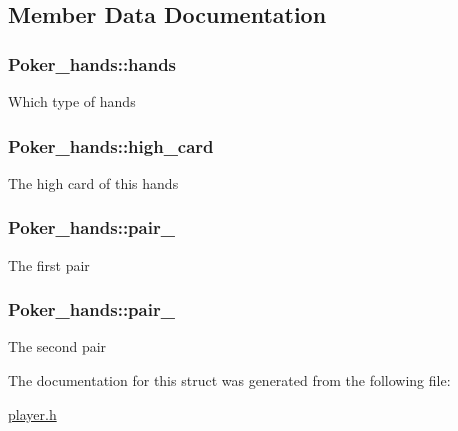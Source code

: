 \subsection{Member Data Documentation}
\hypertarget{structPoker__hands_a7b36a51226eea12e0860c901a770820f}{
\subsubsection[{hands}]{ Poker\+\_\+hands\+::hands}}\label{structPoker__hands_a7b36a51226eea12e0860c901a770820f}
Which type of hands \hypertarget{structPoker__hands_a5e69528aafb7fd7a71ad83d7a7f03456}{
\subsubsection[{high\+\_\+card}]{ Poker\+\_\+hands\+::high\+\_\+card}}\label{structPoker__hands_a5e69528aafb7fd7a71ad83d7a7f03456}
The high card of this hands \hypertarget{structPoker__hands_ad0638d6685ba9b386f479f14c47c0790}{
\subsubsection[{pair\+\_\+1}]{ Poker\+\_\+hands\+::pair\+\_}}\label{structPoker__hands_ad0638d6685ba9b386f479f14c47c0790}
The first pair \hypertarget{structPoker__hands_aaa7790b1295984b266b3609a2f582bb8}{
\subsubsection[{pair\+\_\+2}]{ Poker\+\_\+hands\+::pair\+\_}}\label{structPoker__hands_aaa7790b1295984b266b3609a2f582bb8}
The second pair 

The documentation for this struct was generated from the following file\+:\begin{DoxyCompactItemize}
\item 
\hyperlink{player_8h}{player.\+h}\end{DoxyCompactItemize}
